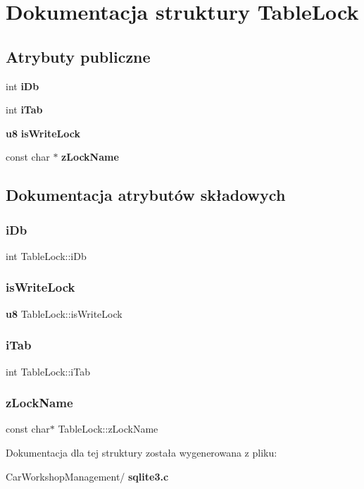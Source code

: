 \section{Dokumentacja struktury Table\+Lock}
\label{struct_table_lock}
\subsection*{Atrybuty publiczne}
\begin{DoxyCompactItemize}
\item 
int \textbf{ i\+Db}
\item 
int \textbf{ i\+Tab}
\item 
\textbf{ u8} \textbf{ is\+Write\+Lock}
\item 
const char $\ast$ \textbf{ z\+Lock\+Name}
\end{DoxyCompactItemize}


\subsection{Dokumentacja atrybutów składowych}
\mbox{\label{struct_table_lock_ad5cc726ef29ffcca39ec0b72942513f6}} 
\subsubsection{iDb}
{\footnotesize\ttfamily int Table\+Lock\+::i\+Db}

\mbox{\label{struct_table_lock_a171121af9886ee08044d4b82b991ceeb}} 
\subsubsection{isWriteLock}
{\footnotesize\ttfamily \textbf{ u8} Table\+Lock\+::is\+Write\+Lock}

\mbox{\label{struct_table_lock_ab25b5d9ba21ed96ed68ce8064ff84e24}} 
\subsubsection{iTab}
{\footnotesize\ttfamily int Table\+Lock\+::i\+Tab}

\mbox{\label{struct_table_lock_a204750eb60519f1a5984c320953badd5}} 
\subsubsection{zLockName}
{\footnotesize\ttfamily const char$\ast$ Table\+Lock\+::z\+Lock\+Name}



Dokumentacja dla tej struktury została wygenerowana z pliku\+:\begin{DoxyCompactItemize}
\item 
Car\+Workshop\+Management/\textbf{ sqlite3.\+c}\end{DoxyCompactItemize}
